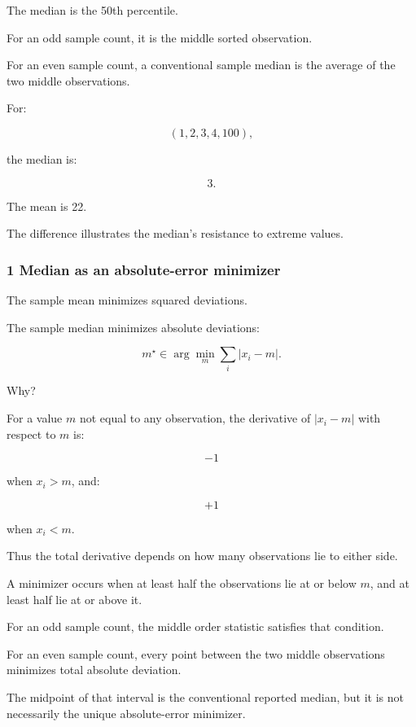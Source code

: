 \hypertarget{02-foundations-ii-ch030-median}{}

The median is the 50th percentile.

For an odd sample count, it is the middle sorted observation.

For an even sample count, a conventional sample median is the average of the two middle observations.

For:

\[
 (1,2,3,4,100),
\]

the median is:

\[
 \boxed{3}.
\]

The mean is 22.

The difference illustrates the median's resistance to extreme values.

\subsubsection{1 Median as an absolute-error minimizer}\label{02-foundations-ii-ch030-median-as-an-absolute-error-minimizer}

\hypertarget{02-foundations-ii-ch030-median-as-an-absolute-error-minimizer}{}

The sample mean minimizes squared deviations.

The sample median minimizes absolute deviations:

\[
 \boxed{ m^\star\in \arg\min_m\sum_i|x_i-m| }.
\]

Why?

For a value \(m\) not equal to any observation, the derivative of \(|x_i-m|\) with respect to \(m\) is:

\[
 -1
\]

when \(x_i>m\), and:

\[
 +1
\]

when \(x_i<m\).

Thus the total derivative depends on how many observations lie to either side.

A minimizer occurs when at least half the observations lie at or below \(m\), and at least half lie at or above it.

For an odd sample count, the middle order statistic satisfies that condition.

For an even sample count, every point between the two middle observations minimizes total absolute deviation.

The midpoint of that interval is the conventional reported median, but it is not necessarily the unique absolute-error minimizer.

